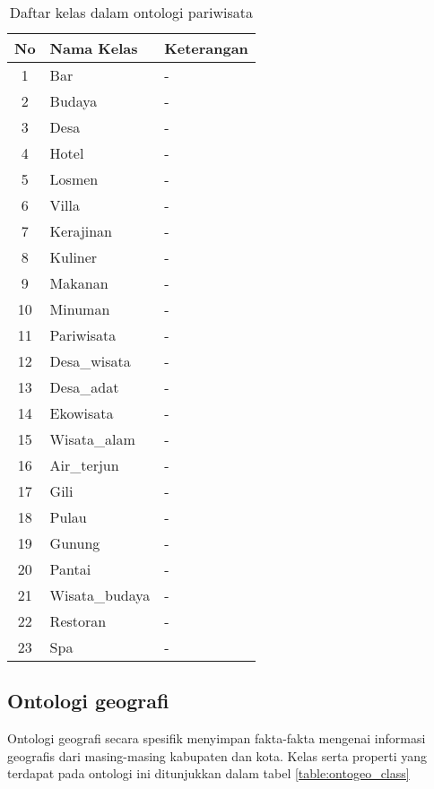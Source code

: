 \begin{table}[ht]
	\caption{Daftar kelas dalam ontologi pariwisata}
	\label{table:ontopar_class}
	\begin{tabularx}{\textwidth}{|c|X|X|}
		\hline
		No & Nama Kelas & Keterangan \\
		\hline
		1 & Bar & - \\
		\hline
		2 & Budaya & - \\
		\hline
		3 & Desa & - \\
		\hline
		4 & Hotel & - \\
		\hline
		5 & Losmen & - \\
		\hline
		6 & Villa & - \\
		\hline
		7 & Kerajinan & - \\
		\hline
		8 & Kuliner & - \\
		\hline
		9 & Makanan & - \\
		\hline
		10 & Minuman & - \\
		\hline
		11 & Pariwisata & - \\
		\hline
		12 & Desa\_wisata & - \\
		\hline
		13 & Desa\_adat & - \\
		\hline
		14 & Ekowisata & - \\
		\hline
		15 & Wisata\_alam & - \\
		\hline
		16 & Air\_terjun & - \\
		\hline
		17 & Gili & - \\
		\hline
		18 & Pulau & - \\
		\hline
		19 & Gunung & - \\
		\hline
		20 & Pantai & - \\
		\hline
		21 & Wisata\_budaya & - \\
		\hline
		22 & Restoran & - \\
		\hline
		23 & Spa & - \\
		\hline
	\end{tabularx}
\end{table}

\subsection{Ontologi geografi}
Ontologi geografi secara spesifik menyimpan fakta-fakta mengenai informasi geografis dari masing-masing kabupaten dan kota. Kelas serta properti yang terdapat pada ontologi ini ditunjukkan dalam tabel \ref{table:ontogeo_class}

